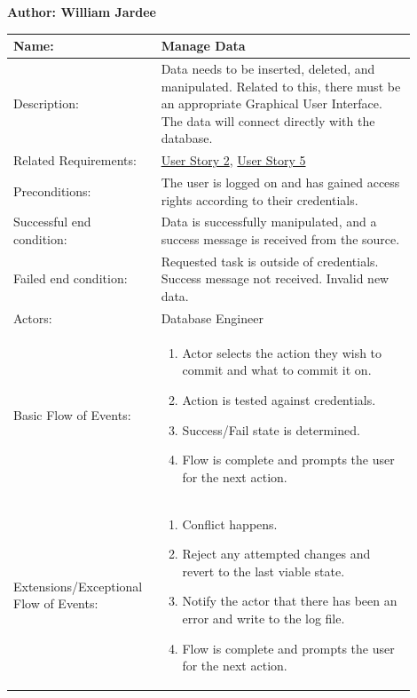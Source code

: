 \documentclass[11pt]{article}
\begin{document}
\begin{table}[!ht]
\begin{center}
\textbf{Author: William Jardee}
\vspace*{1em}

\begin{tabular}{p{0.30\linewidth}p{0.60\linewidth}}
	Name: & Manage Data\\\hline
	Description: & Data needs to be inserted, deleted, and manipulated. Related to this, there must be an appropriate Graphical User Interface. The data will connect directly with the database.\\\hline
	Related Requirements:& \hyperlink{us2}{User Story 2}, \hyperlink{us5}{User Story 5}\\\hline
	Preconditions:& The user is logged on and has gained access rights according to their credentials.\\\hline
	Successful end condition:& Data is successfully manipulated, and a success message is received from the source. \\\hline
	Failed end condition:& Requested task is outside of credentials. Success message not received. Invalid new data.\\\hline
	Actors:& Database Engineer\\\hline
	Basic Flow of Events: & \begin{enumerate}
	\item Actor selects the action they wish to commit and what to commit it on.
	\item Action is tested against credentials.
	\item Success/Fail state is determined.
	\item Flow is complete and prompts the user for the next action.
	\end{enumerate}\\\hline
	Extensions/Exceptional Flow of Events: & \begin{enumerate}
	\item Conflict happens.
	\item Reject any attempted changes and revert to the last viable state.
	\item Notify the actor that there has been an error and write to the log file.
	\item Flow is complete and prompts the user for the next action.
	\end{enumerate}
\end{tabular}
\label{des:man_dat}	
\end{center}
\end{table}
\end{document}
